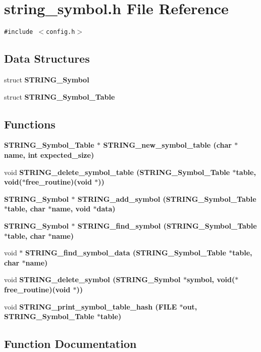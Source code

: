 \section{string\_\-symbol.h File Reference}
\label{string__symbol_8h}
{\tt \#include $<$config.h$>$}\par
\subsection*{Data Structures}
\begin{CompactItemize}
\item 
struct \bf{STRING\_\-Symbol}
\item 
struct \bf{STRING\_\-Symbol\_\-Table}
\end{CompactItemize}
\subsection*{Functions}
\begin{CompactItemize}
\item 
\bf{STRING\_\-Symbol\_\-Table} $\ast$ \bf{STRING\_\-new\_\-symbol\_\-table} (char $\ast$\bf{name}, int expected\_\-size)
\item 
void \bf{STRING\_\-delete\_\-symbol\_\-table} (\bf{STRING\_\-Symbol\_\-Table} $\ast$table, void($\ast$free\_\-routine)(void $\ast$))
\item 
\bf{STRING\_\-Symbol} $\ast$ \bf{STRING\_\-add\_\-symbol} (\bf{STRING\_\-Symbol\_\-Table} $\ast$table, char $\ast$\bf{name}, void $\ast$data)
\item 
\bf{STRING\_\-Symbol} $\ast$ \bf{STRING\_\-find\_\-symbol} (\bf{STRING\_\-Symbol\_\-Table} $\ast$table, char $\ast$\bf{name})
\item 
void $\ast$ \bf{STRING\_\-find\_\-symbol\_\-data} (\bf{STRING\_\-Symbol\_\-Table} $\ast$table, char $\ast$\bf{name})
\item 
void \bf{STRING\_\-delete\_\-symbol} (\bf{STRING\_\-Symbol} $\ast$symbol, void($\ast$free\_\-routine)(void $\ast$))
\item 
void \bf{STRING\_\-print\_\-symbol\_\-table\_\-hash} (FILE $\ast$out, \bf{STRING\_\-Symbol\_\-Table} $\ast$table)
\end{CompactItemize}


\subsection{Function Documentation}
